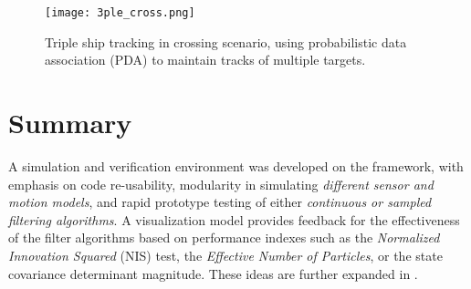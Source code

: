 \begin{figure}[H]
	\centering
	\texttt{[image: 3ple\_cross.png]}
	\caption{Triple ship tracking in crossing scenario, using probabilistic data association (PDA) to maintain tracks of multiple targets.}\label{fig:simulator3}
\end{figure}


\section{Summary}

A simulation and verification environment was developed on the \matlab framework, with emphasis on code re-usability, modularity in simulating \emph{different sensor and motion models}, and rapid prototype testing of either \emph{continuous or sampled filtering algorithms}. A visualization model provides feedback for the effectiveness of the filter algorithms based on performance indexes such as the \emph{Normalized Innovation Squared} (NIS) test, the \emph{Effective Number of Particles}, or the state covariance determinant magnitude. These ideas are further expanded in .



